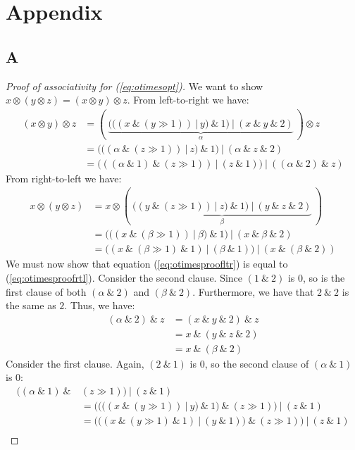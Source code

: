 \section*{Appendix}

\subsection*{A}
\label{app:A}

\begin{proof}[Proof of associativity for (\ref{eq:otimesopt})]
  We want to show $x \otimes (y \otimes z) = (x \otimes y) \otimes z$. From left-to-right we have:
\begin{align}
  (x \otimes y) \otimes z &= (~\underbrace{(((x~\&~(y \gg 1))~|~y)~\&~1)~|~(x~\&~y~\&~2)}_{\alpha}~) \otimes z\\
              &= (((\alpha~\&~(z \gg 1))~|~z)~\&~1)~|~(\alpha~\&~z~\&~2)\\
              \label{eq:otimesproofltr}
              &= (((\alpha~\&~1)~\&~(z \gg 1))~|~(z~\&~1))~|~((\alpha~\&~2)~\&~z)
\end{align}
From right-to-left we have:
\begin{align}
  x \otimes (y \otimes z) &= x \otimes (~\underbrace{((y~\&~(z \gg 1))~|~z)~\&~1)~|~(y~\&~z~\&~2)}_{\beta}~)\\
  &= (((x~\&~(\beta \gg 1))~|~\beta)~\&~1)~|~(x~\&~\beta~\&~2)\\
  \label{eq:otimesproofrtl}
  &= ((x~\&~(\beta \gg 1)~\&~1)~|~(\beta~\&~1))~|~(x~\&~(\beta~\&~2))
\end{align}
We must now show that equation (\ref{eq:otimesproofltr}) is equal to
(\ref{eq:otimesproofrtl}). Consider the second clause. Since $(1~\&~2)$ is $0$,
so is the first clause of both $(\alpha~\&~2)$ and $(\beta~\&~2)$. Furthermore, we have
that $2~\&~2$ is the same as $2$. Thus, we have:
\begin{align}
  (\alpha~\&~2)~\&~z &= (x~\&~y~\&~2)~\&~z\\
                &= x~\&~(y~\&~z~\&~2)\\
                &= x~\&~(\beta~\&~2)
\end{align}
Consider the first clause. Again, $(2~\&~1)$ is $0$, so the second clause of $(\alpha~\&~1)$ is $0$:
\begin{align}
  ((\alpha~\&~1)~\&~&(z \gg 1))~|~(z~\&~1) \\
               &= ((((x~\&~(y \gg 1))~|~y)~\&~1)~\&~(z \gg 1))~|~(z~\&~1) \\
               &= (((x~\&~(y \gg 1)~\&~1)~|~(y~\&~1))~\&~(z \gg 1))~|~(z~\&~1) \\

\end{align}
\end{proof}

